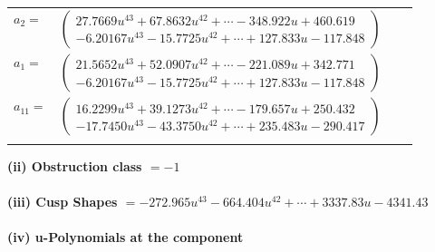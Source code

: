 \documentclass[1p]{elsarticle_modified}
\theoremstyle{definition}
\begin{document}
\begin{tabular}{m{7pt} m{180pt} m{7pt} m{180pt} }
\flushright $a_{2}=$&$\begin{pmatrix}27.7669 u^{43}+67.8632 u^{42}+\cdots-348.922 u+460.619\\-6.20167 u^{43}-15.7725 u^{42}+\cdots+127.833 u-117.848\end{pmatrix}$ \\
\flushright $a_{1}=$&$\begin{pmatrix}21.5652 u^{43}+52.0907 u^{42}+\cdots-221.089 u+342.771\\-6.20167 u^{43}-15.7725 u^{42}+\cdots+127.833 u-117.848\end{pmatrix}$ \\
\flushright $a_{11}=$&$\begin{pmatrix}16.2299 u^{43}+39.1273 u^{42}+\cdots-179.657 u+250.432\\-17.7450 u^{43}-43.3750 u^{42}+\cdots+235.483 u-290.417\end{pmatrix}$\\&\end{tabular}
\flushleft \textbf{(ii) Obstruction class $= -1$}\\~\\
\flushleft \textbf{(iii) Cusp Shapes $= -272.965 u^{43}-664.404 u^{42}+\cdots+3337.83 u-4341.43$}\\~\\
\newpage\renewcommand{\arraystretch}{1}
\flushleft \textbf{(iv) u-Polynomials at the component}\newline \\
\end{document}
